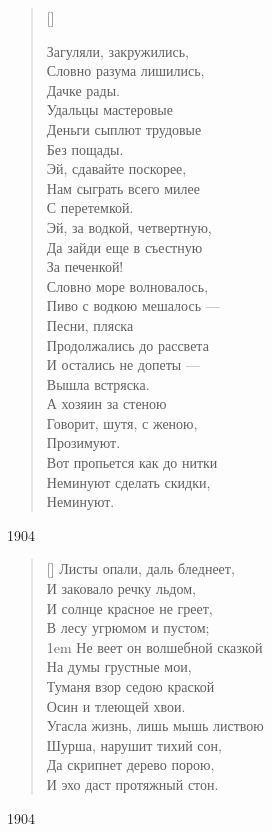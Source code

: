 \settowidth{\versewidth}{Загуляли, закружились}
\begin{verse}[\versewidth]
\begin{patverse*}
Загуляли, закружились,\\
Словно разума лишились,\\
Дачке рады.\\
Удальцы мастеровые\\
Деньги сыплют трудовые\\
Без пощады.\\
Эй, сдавайте поскорее,\\
Нам сыграть всего милее\\
С перетемкой.\\
Эй, за водкой, четвертную,\\
Да зайди еще в съестную\\
За печенкой!\\
Словно море волновалось,\\
Пиво с водкою мешалось ---\\
Песни, пляска\\
Продолжались до рассвета\\
И остались не допеты ---\\
Вышла встряска.\\
А хозяин за стеною\\
Говорит, шутя, с женою,\\
Прозимуют.\\
Вот пропьется как до нитки\\
Неминуют сделать скидки,\\
Неминуют.
\end{patverse*}
\end{verse}
1904

\settowidth{\versewidth}{\vinНе веет он волшебной сказкой}
\begin{verse}[\versewidth]
Листы опали, даль бледнеет,\\
И заковало речку льдом,\\
И солнце красное не греет,\\
В лесу угрюмом и пустом;\\
\begingroup
\leftskip1em
\rightskip\leftskip
Не веет он волшебной сказкой\\
На думы грустные мои,\\
Туманя взор седою краской\\
Осин и тлеющей хвои.\\
\endgroup
Угасла жизнь, лишь мышь листвою\\
Шурша, нарушит тихий сон,\\
Да скрипнет дерево порою,\\
И эхо даст протяжный стон.
\end{verse}
1904

